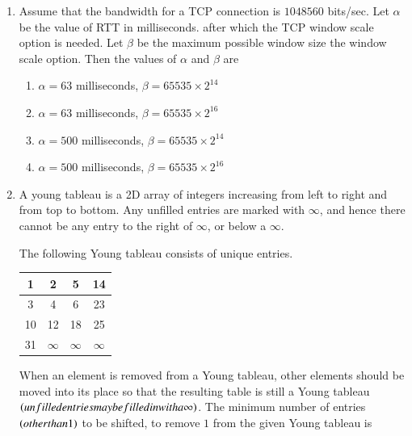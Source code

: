 \documentclass[journal,12pt,onecolumn]{IEEEtran}
\theoremstyle{remark}
\begin{document}
\begin{enumerate}
		\item Assume that the bandwidth for a TCP connection is $1048560$ bits/sec. Let $\alpha$ be the value of RTT in milliseconds.  after which the TCP window scale option is needed. Let $\beta$ be the maximum possible window size the window scale option. Then the values of $\alpha$ and $\beta$ are
		
		\hfill{}
		
		\begin{enumerate}
			\item $\alpha = 63$ milliseconds, $\beta = 65535 \times 2^{14}$
			\item $\alpha = 63$ milliseconds, $\beta = 65535 \times 2^{16}$
			\item $\alpha = 500$ milliseconds, $\beta = 65535 \times 2^{14}$
			\item $\alpha = 500$ milliseconds, $\beta = 65535 \times 2^{16}$
		\end{enumerate}
		
		\item A young tableau is a 2D array of integers increasing from left to right and from top to bottom. Any unfilled entries are marked with $\infty$, and hence there cannot be any entry to the right of $\infty$, or below a $\infty$.
		
		The following Young tableau consists of unique entries.


\begin{center}
	\setlength{\arrayrulewidth}{0.8pt}
	\renewcommand{\arraystretch}{1.5}
	
	\begin{tabular}{|c|c|c|c|}
		\hline
		1  & 2  & 5  & 14 \\
		\hline
		3  & 4  & 6  & 23 \\
		\hline
		10 & 12 & 18 & 25 \\
		\hline
		31 & $\infty$ & $\infty$ & $\infty$ \\
		\hline
	\end{tabular}
\end{center}
When an element is removed from a Young tableau, other elements should be moved into its place so that the resulting table is still a Young tableau $\left(unfilled entries may be filled in with a \infty\right)$. The minimum number of entries $\left(other than 1\right)$ to be shifted, to remove $1$ from the given Young tableau is \underline{\hspace{2cm}}
		
		\hfill{}
		

\end{enumerate}
\end{document}
